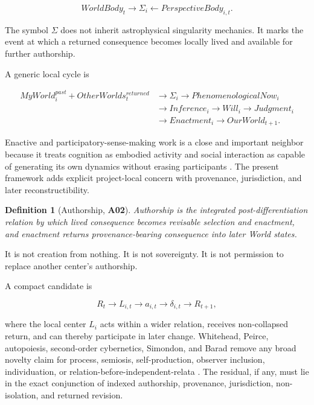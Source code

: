 \documentclass[11pt]{article}
\newtheorem{definition}{Definition}
\newcommand{\claim}[1]{\textsf{\textbf{#1}}}
\begin{document}
\begin{equation}
WorldBody_t\rightarrow\Sigma_i\leftarrow PerspectiveBody_{i,t}.
\end{equation}

The symbol $\Sigma$ does not inherit astrophysical singularity mechanics. It marks the event at which a returned consequence becomes locally lived and available for further authorship.

A generic local cycle is

\begin{equation}
\begin{aligned}
MyWorld_i^{past}+OtherWorlds_t^{returned}
&\rightarrow \Sigma_i\rightarrow PhenomenologicalNow_i\\
&\rightarrow Inference_i\rightarrow Will_i\rightarrow Judgment_i\\
&\rightarrow Enactment_i\rightarrow OurWorld_{t+1}.
\end{aligned}
\end{equation}

Enactive and participatory-sense-making work is a close and important neighbor because it treats cognition as embodied activity and social interaction as capable of generating its own dynamics without erasing participants \cite{DeJaegherDiPaolo2007Participatory,MaturanaVarela1980Autopoiesis}. The present framework adds explicit project-local concern with provenance, jurisdiction, and later reconstructibility.

\begin{definition}[Authorship, \claim{A02}]
Authorship is the integrated post-differentiation relation by which lived consequence becomes revisable selection and enactment, and enactment returns provenance-bearing consequence into later World states.
\end{definition}

It is not creation from nothing. It is not sovereignty. It is not permission to replace another center's authorship.

A compact candidate is

\begin{equation}
R_t\rightarrow L_{i,t}\rightarrow a_{i,t}\rightarrow\delta_{i,t}\rightarrow R_{t+1},
\end{equation}

where the local center $L_i$ acts within a wider relation, receives non-collapsed return, and can thereby participate in later change. Whitehead, Peirce, autopoiesis, second-order cybernetics, Simondon, and Barad remove any broad novelty claim for process, semiosis, self-production, observer inclusion, individuation, or relation-before-independent-relata \cite{Whitehead1978Process,PeirceSemioticsSEP,MaturanaVarela1980Autopoiesis,VonFoerster2003Understanding,Simondon2020Individuation,Barad2007}. The residual, if any, must lie in the exact conjunction of indexed authorship, provenance, jurisdiction, non-isolation, and returned revision.
\end{document}
